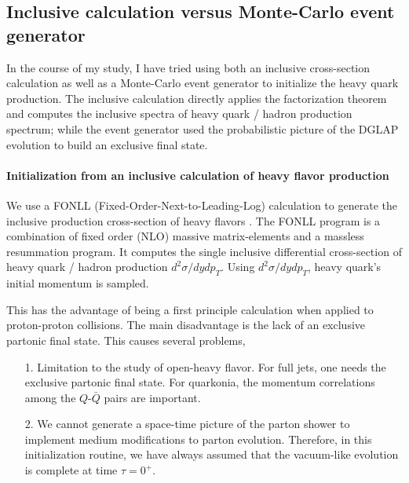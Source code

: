 \subsection{Inclusive calculation versus Monte-Carlo event generator}
In the course of my study, I have tried using both an inclusive cross-section calculation as well as a Monte-Carlo event generator to initialize the heavy quark production.
The inclusive calculation directly applies the factorization theorem and computes the inclusive spectra of heavy quark / hadron production spectrum; while the event generator used the probabilistic picture of the DGLAP evolution to build an exclusive final state.

\paragraph{Initialization from an inclusive calculation of heavy flavor production}
We use a  FONLL (Fixed-Order-Next-to-Leading-Log) calculation to generate the inclusive production cross-section of heavy flavors \cite{Cacciari:1998it}.
The FONLL program is a combination of fixed order (NLO) massive matrix-elements and a massless resummation program.
It computes the single inclusive differential cross-section of heavy quark / hadron production $d^2\sigma/dydp_T$.
Using $d^2\sigma/dydp_T$, heavy quark's initial momentum is sampled.

This has the advantage of being a first principle calculation when applied to proton-proton collisions. 
The main disadvantage is the lack of an exclusive partonic final state.
This causes several problems,
\begin{itemize}
\item[1.] Limitation to the study of open-heavy flavor.
For full jets, one needs the exclusive partonic final state. For quarkonia, the momentum correlations among the $Q$-$\bar{Q}$ pairs are important.
\item[2.] We cannot generate a space-time picture of the parton shower to implement medium modifications to parton evolution. 
Therefore, in this initialization routine, we have always assumed that the vacuum-like evolution is complete at time $\tau=0^{+}$.
\end{itemize}

